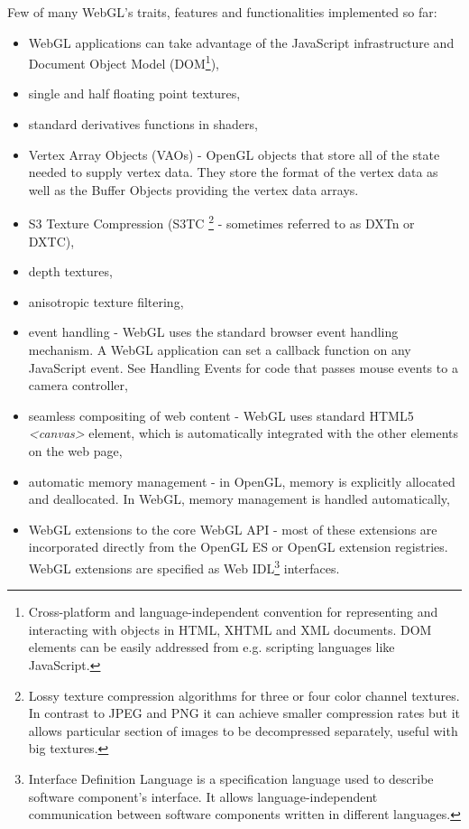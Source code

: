 Few of many WebGL's traits, features and functionalities implemented so far:
\begin{itemize}
\item WebGL applications can take advantage of the JavaScript infrastructure and Document Object Model (DOM\footnote{Cross-platform and language-independent convention for representing and interacting with objects in HTML, XHTML and XML documents. DOM elements can be easily addressed from e.g. scripting languages like JavaScript.}),
\item single and half floating point textures,
\item standard derivatives functions in shaders,
\item Vertex Array Objects (VAOs) - OpenGL objects that store all of the state needed to supply vertex data. They store the format of the vertex data as well as the Buffer Objects providing the vertex data arrays.
\item S3 Texture Compression (S3TC \footnote{Lossy texture compression algorithms for three or four color channel textures. In contrast to JPEG and PNG it can achieve smaller compression rates but it allows particular section of images to be decompressed separately, useful with big textures.} - sometimes referred to as DXTn or DXTC),
\item depth textures,
\item anisotropic texture filtering,
\item event handling - WebGL uses the standard browser event handling mechanism. A WebGL application can set a callback function on any JavaScript event. See Handling Events for code that passes mouse events to a camera controller,
\item seamless compositing of web content - WebGL uses standard HTML5 \emph{<canvas>} element, which is automatically integrated with the other elements on the web page,
\item automatic memory management - in OpenGL, memory is explicitly allocated and deallocated. In WebGL, memory management is handled automatically,
\item WebGL extensions to the core WebGL API - most of these extensions are incorporated directly from the OpenGL ES or OpenGL extension registries.
WebGL extensions are specified as Web IDL\footnote{Interface Definition Language is a specification language used to describe software component's interface. It allows language-independent communication between software components written in different languages.} interfaces.
\end{itemize}